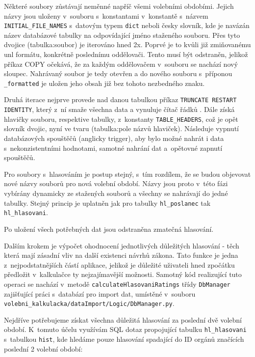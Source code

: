 \par Některé soubory zůstávají neměnné napříč všemi volebními obdobími. Jejich názvy jsou uloženy v~souboru s~konstantami v~konstantě s~názvem \texttt{INITIAL\_FILE\_NAMES} s~datovým typem \texttt{dict} neboli česky slovník, kde je navázán název databázové tabulky na odpovídající jméno staženého souboru. Přes tyto dvojice (tabulka:soubor) je iterováno hned 2x. Poprvé je to kvůli již zmiňovanému unl formátu, konkrétně poslednímu oddělovači. Tento musí být odstraněn, jelikož příkaz COPY očekává, že za každým oddělovačem v~souboru se nachází nový sloupec. Nahrávaný soubor je tedy otevřen a do nového souboru s~příponou \texttt{\_formatted} je uložen jeho obsah již bez tohoto nezbedného znaku.
\par Druhá iterace nejprve provede nad danou tabulkou příkaz \texttt{TRUNCATE RESTART IDENTITY}, který z~ní smaže všechna data a vynuluje čítač řádků \cite{psql-truncate}. Dále získá hlavičky souboru, respektive tabulky, z~konstanty \texttt{TABLE\_HEADERS}, což je opět slovník dvojic, nyní ve tvaru (tabulka:pole názvů hlaviček). Následuje vypnutí databázových spouštěčů (anglicky trigger), aby bylo možné nahrát i data s~nekonzistentními hodnotami, samotné nahrání dat a~opětovné zapnutí spouštěčů. 

\par Pro soubory s~hlasováním je postup stejný, s~tím rozdílem, že se budou objevovat nové názvy souborů pro nová volební období. Názvy jsou proto v~této fázi vybírány dynamicky ze stažených souborů a všechny se nahrávají do jedné tabulky. Stejný princip je uplatněn jak pro tabulky \texttt{hl\_poslanec} tak \texttt{hl\_hlasovani}.

\par Po uložení všech potřebných dat jsou odstraněna zmatečná hlasování.\\ 

\par Dalším krokem je výpočet ohodnocení jednotlivých důležitých hlasování - těch která mají zásadní vliv na další existenci návrhů zákona. Tato funkce je jedna z~nejpodstatnějších částí aplikace, jelikož je důležité uživateli hned zpočátku předložit v~kalkulačce ty nejzajímavější možnosti. Samotný kód realizující tuto operaci se nachází v~metodě \texttt{calculateHlasovaniRatings} třídy \texttt{DbManager} zajišťující práci s~databází pro import dat, umístěné v~souboru \texttt{volebni\_kalkulacka/dataImport/Logic/DbManager.py}. 
\par Nejdříve potřebujeme získat všechna důležitá hlasování za poslední dvě volební období. K~tomuto účelu využívám SQL dotaz propojující tabulku \texttt{hl\_hlasovani} s~tabulkou \texttt{hist}, kde hledáme pouze hlasování spadající do ID orgánů značících poslední 2 volební období:

